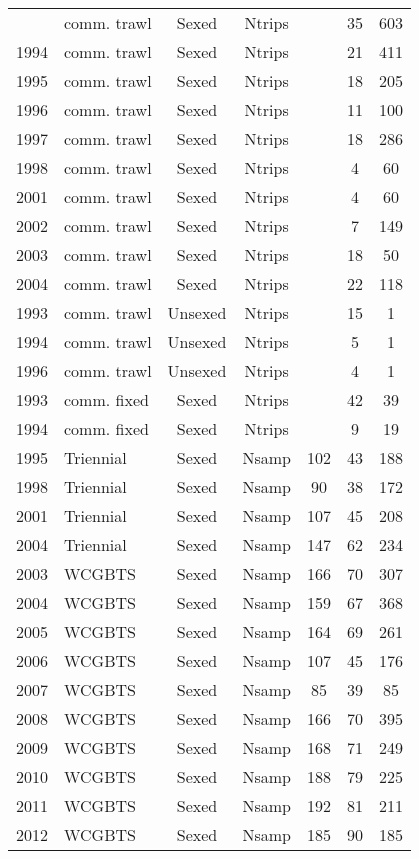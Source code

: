 \begin{longtable}[t]{c>{\centering\arraybackslash}p{3cm}ccccc}
\endfoot
\bottomrule
\endlastfoot
1993 & comm. trawl & Sexed & Ntrips &  & 35 & 603\\
1994 & comm. trawl & Sexed & Ntrips &  & 21 & 411\\
1995 & comm. trawl & Sexed & Ntrips &  & 18 & 205\\
1996 & comm. trawl & Sexed & Ntrips &  & 11 & 100\\
1997 & comm. trawl & Sexed & Ntrips &  & 18 & 286\\
1998 & comm. trawl & Sexed & Ntrips &  & 4 & 60\\
2001 & comm. trawl & Sexed & Ntrips &  & 4 & 60\\
2002 & comm. trawl & Sexed & Ntrips &  & 7 & 149\\
2003 & comm. trawl & Sexed & Ntrips &  & 18 & 50\\
2004 & comm. trawl & Sexed & Ntrips &  & 22 & 118\\
1993 & comm. trawl & Unsexed & Ntrips &  & 15 & 1\\
1994 & comm. trawl & Unsexed & Ntrips &  & 5 & 1\\
1996 & comm. trawl & Unsexed & Ntrips &  & 4 & 1\\
1993 & comm. fixed & Sexed & Ntrips &  & 42 & 39\\
1994 & comm. fixed & Sexed & Ntrips &  & 9 & 19\\
1995 & Triennial & Sexed & Nsamp & 102 & 43 & 188\\
1998 & Triennial & Sexed & Nsamp & 90 & 38 & 172\\
2001 & Triennial & Sexed & Nsamp & 107 & 45 & 208\\
2004 & Triennial & Sexed & Nsamp & 147 & 62 & 234\\
2003 & WCGBTS & Sexed & Nsamp & 166 & 70 & 307\\
2004 & WCGBTS & Sexed & Nsamp & 159 & 67 & 368\\
2005 & WCGBTS & Sexed & Nsamp & 164 & 69 & 261\\
2006 & WCGBTS & Sexed & Nsamp & 107 & 45 & 176\\
2007 & WCGBTS & Sexed & Nsamp & 85 & 39 & 85\\
2008 & WCGBTS & Sexed & Nsamp & 166 & 70 & 395\\
2009 & WCGBTS & Sexed & Nsamp & 168 & 71 & 249\\
2010 & WCGBTS & Sexed & Nsamp & 188 & 79 & 225\\
2011 & WCGBTS & Sexed & Nsamp & 192 & 81 & 211\\
2012 & WCGBTS & Sexed & Nsamp & 185 & 90 & 185\\

\end{longtable}
